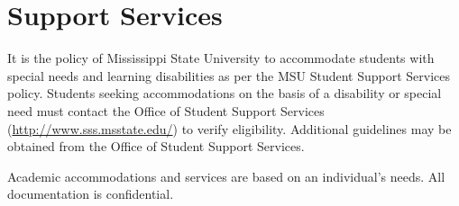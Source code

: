 \section{Support Services}

It is the policy of Mississippi State University to accommodate students with special needs and learning disabilities as per the MSU Student Support Services policy. Students seeking accommodations on the basis of a disability or special need must contact the Office of Student Support Services (\url{http://www.sss.msstate.edu/}) to verify eligibility. Additional guidelines may be obtained from the Office of Student Support Services.

Academic accommodations and services are based on an individual’s needs.  All documentation is confidential. 
